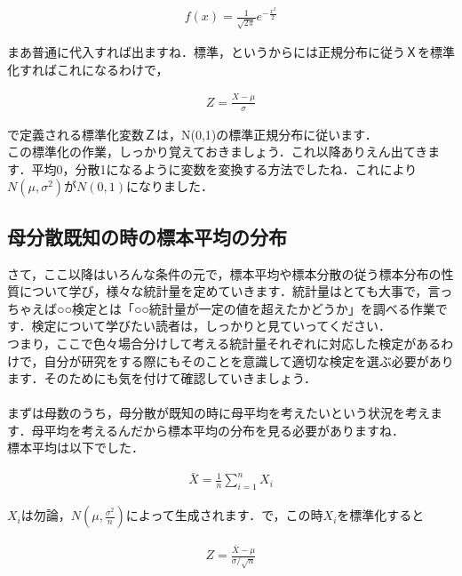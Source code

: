 \documentclass[11pt,a4paper,uplatex]{ujreport} 	%
\begin{document}
\begin{align}
  f(x) = \frac{1}{\sqrt{2\pi}}e^{-\frac{x^2}{2}}
\end{align}

まあ普通に代入すれば出ますね．標準，というからには正規分布に従うＸを標準化すればこれになるわけで，

\begin{align}
  Z = \frac{X-\mu}{\sigma}
\end{align}

で定義される標準化変数Ｚは，N(0,1)の標準正規分布に従います．\\

この標準化の作業，しっかり覚えておきましょう．これ以降ありえん出てきます．平均0，分散1になるように変数を変換する方法でしたね．これにより$N(\mu, \sigma^2)$が$N(0,1)$になりました．



\subsection{母分散既知の時の標本平均の分布}
さて，ここ以降はいろんな条件の元で，標本平均や標本分散の従う標本分布の性質について学び，様々な統計量を定めていきます．統計量はとても大事で，言っちゃえば○○検定とは「○○統計量が一定の値を超えたかどうか」を調べる作業です．検定について学びたい読者は，しっかりと見ていってください．\\

つまり，ここで色々場合分けして考える統計量それぞれに対応した検定があるわけで，自分が研究をする際にもそのことを意識して適切な検定を選ぶ必要があります．そのためにも気を付けて確認していきましょう．\\
\\

まずは母数のうち，母分散が既知の時に母平均を考えたいという状況を考えます．母平均を考えるんだから標本平均の分布を見る必要がありますね．\\

標本平均は以下でした．

\begin{align}
  \bar{X} = \frac{1}{n}\sum_{i=1}^n X_i
\end{align}

$X_i$は勿論，$N(\mu, \frac{\sigma^2}{n})$によって生成されます．で，この時$X_i$を標準化すると

\begin{align}
  Z = \frac{\bar{X}-\mu}{\sigma/\sqrt{n}}
  \label{eq:z}
\end{align}
\end{document}
